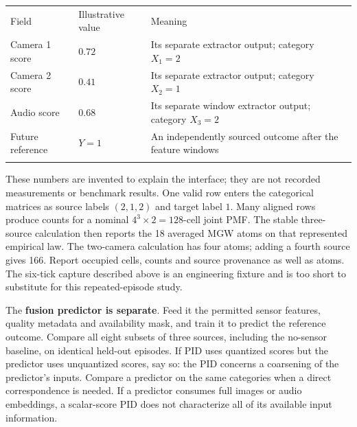 \documentclass[11pt,a4paper]{article}
\newcounter{none}
\begin{document}
{\def\LTcaptype{none} %
\begin{longtable}[]{@{}
  >{\raggedright\arraybackslash}p{}
  >{\raggedright\arraybackslash}p{}
  >{\raggedright\arraybackslash}p{}@{}}
\toprule\noalign{}
\begin{minipage}[b]{\linewidth}\raggedright
Field
\end{minipage} & \begin{minipage}[b]{\linewidth}\raggedright
Illustrative value
\end{minipage} & \begin{minipage}[b]{\linewidth}\raggedright
Meaning
\end{minipage} \\*
\midrule\noalign{}
\endhead
\bottomrule\noalign{}
\endfoot
Camera 1 score & \(0.72\) & Its separate extractor output; category \(X_1=2\) \\*
Camera 2 score & \(0.41\) & Its separate extractor output; category \(X_2=1\) \\*
Audio score & \(0.68\) & Its separate window extractor output; category \(X_3=2\) \\*
Future reference & \(Y=1\) & An independently sourced outcome after the feature windows \\*
\end{longtable}
}

These numbers are invented to explain the interface; they are not recorded measurements or benchmark results. One valid row enters the categorical matrices as source labels \((2,1,2)\) and target label \(1\). Many aligned rows produce counts for a nominal \(4^3\times2=128\)-cell joint PMF. The stable three-source calculation then reports the 18 averaged MGW atoms on that represented empirical law. The two-camera calculation has four atoms; adding a fourth source gives 166. Report occupied cells, counts and source provenance as well as atoms. The six-tick capture described above is an engineering fixture and is too short to substitute for this repeated-episode study.

The \textbf{fusion predictor is separate}. Feed it the permitted sensor features, quality metadata and availability mask, and train it to predict the reference outcome. Compare all eight subsets of three sources, including the no-sensor baseline, on identical held-out episodes. If PID uses quantized scores but the predictor uses unquantized scores, say so: the PID concerns a coarsening of the predictor's inputs. Compare a predictor on the same categories when a direct correspondence is needed. If a predictor consumes full images or audio embeddings, a scalar-score PID does not characterize all of its available input information.
\end{document}
